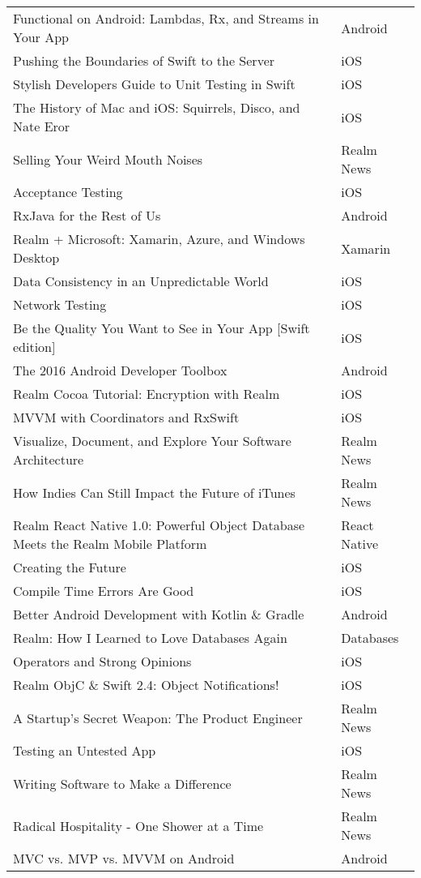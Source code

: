 \documentclass[letterpaper,11pt]{article}
\begin{document}
\begin{table}[htb]
\begin{tabular}{ | l | l |}
Functional on Android: Lambdas, Rx, and Streams in Your App & Android \\ 
Pushing the Boundaries of Swift to the Server & iOS \\ 
Stylish Developers Guide to Unit Testing in Swift & iOS \\ 
The History of Mac and iOS: Squirrels, Disco, and Nate Eror & iOS \\ 
Selling Your Weird Mouth Noises & Realm News \\ 
Acceptance Testing & iOS \\ 
RxJava for the Rest of Us & Android \\ 
Realm + Microsoft: Xamarin, Azure, and Windows Desktop & Xamarin \\ 
Data Consistency in an Unpredictable World & iOS \\ 
Network Testing & iOS \\ 
Be the Quality You Want to See in Your App [Swift edition] & iOS \\ 
The 2016 Android Developer Toolbox & Android \\ 
Realm Cocoa Tutorial: Encryption with Realm & iOS \\ 
MVVM with Coordinators and RxSwift & iOS \\ 
Visualize, Document, and Explore Your Software Architecture & Realm News \\ 
How Indies Can Still Impact the Future of iTunes & Realm News \\ 
Realm React Native 1.0: Powerful Object Database Meets the Realm Mobile Platform & React Native \\ 
Creating the Future & iOS \\ 
Compile Time Errors Are Good & iOS \\ 
Better Android Development with Kotlin \& Gradle & Android \\ 
Realm: How I Learned to Love Databases Again & Databases \\ 
Operators and Strong Opinions & iOS \\ 
Realm ObjC \& Swift 2.4: Object Notifications! & iOS \\ 
A Startup’s Secret Weapon: The Product Engineer & Realm News \\ 
Testing an Untested App & iOS \\ 
Writing Software to Make a Difference & Realm News \\ 
Radical Hospitality - One Shower at a Time & Realm News \\ 
MVC vs. MVP vs. MVVM on Android & Android \\ 

\end{tabular}
\end{table}
\end{document}
